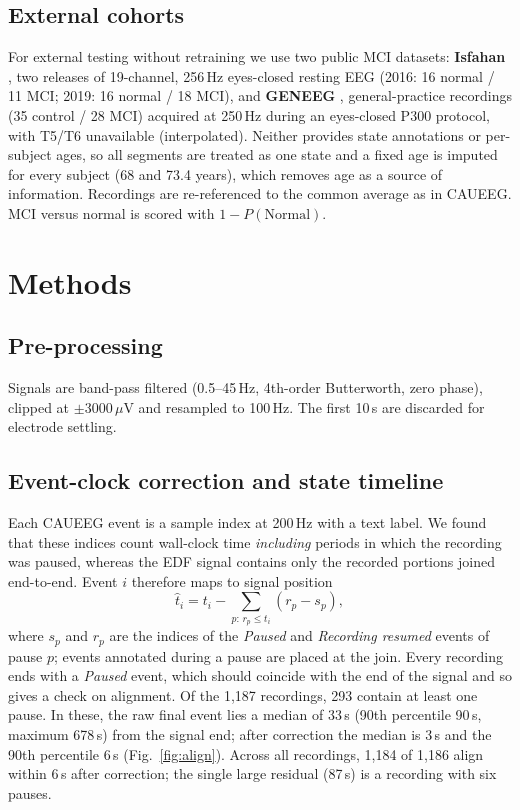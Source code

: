 \documentclass[conference]{IEEEtran}
\begin{document}
\subsection{External cohorts}
For external testing without retraining we use two public MCI datasets: \textbf{Isfahan}
\cite{kashefpoor2016automatic,kashefpoor2019supervised}, two releases of 19-channel, 256\,Hz eyes-closed
resting EEG (2016: 16 normal / 11 MCI; 2019: 16 normal / 18 MCI), and \textbf{GENEEG}
\cite{geneeg2025}, general-practice recordings (35 control / 28 MCI) acquired at 250\,Hz during an
eyes-closed P300 protocol, with T5/T6 unavailable (interpolated). Neither provides state annotations
or per-subject ages, so all segments are treated as one state and a fixed age is imputed for every
subject (68 and 73.4 years), which removes age as a source of information. Recordings are
re-referenced to the common average as in CAUEEG. MCI versus normal is scored with
$1-P(\text{Normal})$.

\section{Methods}

\subsection{Pre-processing}
Signals are band-pass filtered (0.5--45\,Hz, 4th-order Butterworth, zero phase), clipped at
$\pm 3000\,\mu$V and resampled to 100\,Hz. The first 10\,s are discarded for electrode settling.

\subsection{Event-clock correction and state timeline}
\label{sec:events}
Each CAUEEG event is a sample index at 200\,Hz with a text label. We found that these indices count
wall-clock time \emph{including} periods in which the recording was paused, whereas the EDF signal
contains only the recorded portions joined end-to-end. Event $i$ therefore maps to signal position
\begin{equation}
\hat{t}_i = t_i - \sum_{p:\, r_p \le t_i} (r_p - s_p),
\end{equation}
where $s_p$ and $r_p$ are the indices of the \textit{Paused} and \textit{Recording resumed} events of
pause $p$; events annotated during a pause are placed at the join. Every recording ends with a
\textit{Paused} event, which should coincide with the end of the signal and so gives a check on
alignment. Of the 1,187 recordings, 293 contain at least one pause. In these, the raw final event lies
a median of 33\,s (90th percentile 90\,s, maximum 678\,s) from the signal end; after correction the
median is 3\,s and the 90th percentile 6\,s (Fig.~\ref{fig:align}). Across all recordings, 1,184 of
1,186 align within 6\,s after correction; the single large residual (87\,s) is a recording with six
pauses.
\end{document}
